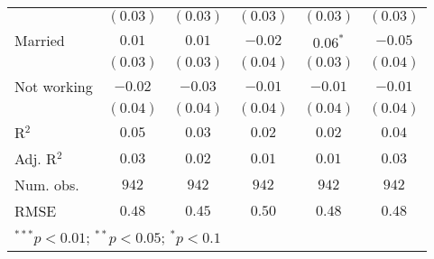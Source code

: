 \begin{table}
\begin{center}
\begin{tabular}{l c c c c c}
              & $(0.03)$      & $(0.03)$      & $(0.03)$     & $(0.03)$    & $(0.03)$      \\
Married       & $0.01$        & $0.01$        & $-0.02$      & $0.06^{*}$  & $-0.05$       \\
              & $(0.03)$      & $(0.03)$      & $(0.04)$     & $(0.03)$    & $(0.04)$      \\
Not working   & $-0.02$       & $-0.03$       & $-0.01$      & $-0.01$     & $-0.01$       \\
              & $(0.04)$      & $(0.04)$      & $(0.04)$     & $(0.04)$    & $(0.04)$      \\
\midrule
R$^2$         & $0.05$        & $0.03$        & $0.02$       & $0.02$      & $0.04$        \\
Adj. R$^2$    & $0.03$        & $0.02$        & $0.01$       & $0.01$      & $0.03$        \\
Num. obs.     & $942$         & $942$         & $942$        & $942$       & $942$         \\
RMSE          & $0.48$        & $0.45$        & $0.50$       & $0.48$      & $0.48$        \\
\bottomrule
\multicolumn{6}{l}{\scriptsize{$^{***}p<0.01$; $^{**}p<0.05$; $^{*}p<0.1$}}
\end{tabular}
\label{tab_risk_week}
\end{center}
\end{table}
